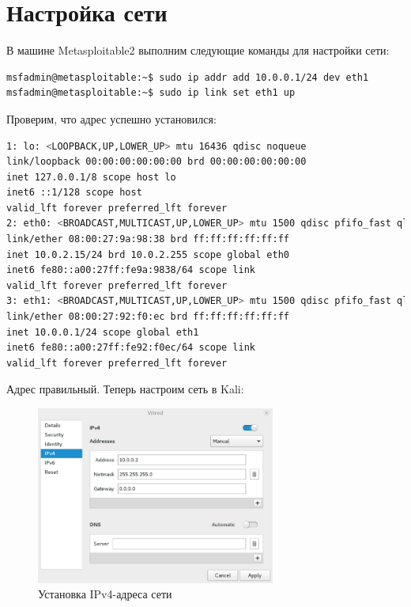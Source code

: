 \section{Настройка сети}

В машине Metasploitable2 выполним следующие команды для настройки сети:

\begin{lstlisting}[language=bash,caption={bash version}]
msfadmin@metasploitable:~$ sudo ip addr add 10.0.0.1/24 dev eth1
msfadmin@metasploitable:~$ sudo ip link set eth1 up
\end{lstlisting}

Проверим, что адрес успешно установился:

\begin{lstlisting}[language=bash]
1: lo: <LOOPBACK,UP,LOWER_UP> mtu 16436 qdisc noqueue 
link/loopback 00:00:00:00:00:00 brd 00:00:00:00:00:00
inet 127.0.0.1/8 scope host lo
inet6 ::1/128 scope host 
valid_lft forever preferred_lft forever
2: eth0: <BROADCAST,MULTICAST,UP,LOWER_UP> mtu 1500 qdisc pfifo_fast qlen 1000
link/ether 08:00:27:9a:98:38 brd ff:ff:ff:ff:ff:ff
inet 10.0.2.15/24 brd 10.0.2.255 scope global eth0
inet6 fe80::a00:27ff:fe9a:9838/64 scope link 
valid_lft forever preferred_lft forever
3: eth1: <BROADCAST,MULTICAST,UP,LOWER_UP> mtu 1500 qdisc pfifo_fast qlen 1000
link/ether 08:00:27:92:f0:ec brd ff:ff:ff:ff:ff:ff
inet 10.0.0.1/24 scope global eth1
inet6 fe80::a00:27ff:fe92:f0ec/64 scope link 
valid_lft forever preferred_lft forever
\end{lstlisting}

Адрес правильный. Теперь настроим сеть в Kali:

\begin{figure}[H]
	\centering
	\includegraphics[width=0.7\textwidth]{images/1.png}
	\caption{Установка IPv4-адреса сети}
\end{figure}

